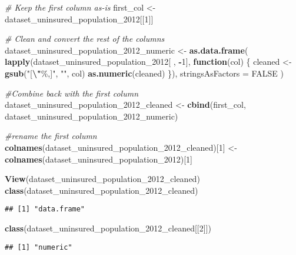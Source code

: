 \documentclass[
]{article}
\newenvironment{Shaded}{\begin{snugshade}}{\end{snugshade}}
\newcommand{\AttributeTok}[1]{\textcolor[rgb]{0.13,0.29,0.53}{#1}}
\newcommand{\CommentTok}[1]{\textcolor[rgb]{0.56,0.35,0.01}{\textit{#1}}}
\newcommand{\ConstantTok}[1]{\textcolor[rgb]{0.56,0.35,0.01}{#1}}
\newcommand{\ControlFlowTok}[1]{\textcolor[rgb]{0.13,0.29,0.53}{\textbf{#1}}}
\newcommand{\DecValTok}[1]{\textcolor[rgb]{0.00,0.00,0.81}{#1}}
\newcommand{\FunctionTok}[1]{\textcolor[rgb]{0.13,0.29,0.53}{\textbf{#1}}}
\newcommand{\NormalTok}[1]{#1}
\newcommand{\OtherTok}[1]{\textcolor[rgb]{0.56,0.35,0.01}{#1}}
\newcommand{\SpecialCharTok}[1]{\textcolor[rgb]{0.81,0.36,0.00}{\textbf{#1}}}
\newcommand{\StringTok}[1]{\textcolor[rgb]{0.31,0.60,0.02}{#1}}
\begin{document}
\begin{Shaded}
\begin{Highlighting}[]
\CommentTok{\# Keep the first column as{-}is}
\NormalTok{first\_col }\OtherTok{\textless{}{-}}\NormalTok{ dataset\_uninsured\_population\_2012[[}\DecValTok{1}\NormalTok{]]}

\CommentTok{\# Clean and convert the rest of the columns}
\NormalTok{dataset\_uninsured\_population\_2012\_numeric }\OtherTok{\textless{}{-}} \FunctionTok{as.data.frame}\NormalTok{(}
  \FunctionTok{lapply}\NormalTok{(dataset\_uninsured\_population\_2012[ , }\SpecialCharTok{{-}}\DecValTok{1}\NormalTok{], }\ControlFlowTok{function}\NormalTok{(col) \{}
\NormalTok{    cleaned }\OtherTok{\textless{}{-}} \FunctionTok{gsub}\NormalTok{(}\StringTok{"[}\SpecialCharTok{\textbackslash{}"}\StringTok{\%,]"}\NormalTok{, }\StringTok{""}\NormalTok{, col)}
    \FunctionTok{as.numeric}\NormalTok{(cleaned)}
\NormalTok{  \}),}
  \AttributeTok{stringsAsFactors =} \ConstantTok{FALSE}
\NormalTok{)}

\CommentTok{\#Combine back with the first column}
\NormalTok{dataset\_uninsured\_population\_2012\_cleaned }\OtherTok{\textless{}{-}} \FunctionTok{cbind}\NormalTok{(first\_col, dataset\_uninsured\_population\_2012\_numeric)}

\CommentTok{\#rename the first column}
\FunctionTok{colnames}\NormalTok{(dataset\_uninsured\_population\_2012\_cleaned)[}\DecValTok{1}\NormalTok{] }\OtherTok{\textless{}{-}} \FunctionTok{colnames}\NormalTok{(dataset\_uninsured\_population\_2012)[}\DecValTok{1}\NormalTok{]}

\FunctionTok{View}\NormalTok{(dataset\_uninsured\_population\_2012\_cleaned)}
\FunctionTok{class}\NormalTok{(dataset\_uninsured\_population\_2012\_cleaned)}
\end{Highlighting}
\end{Shaded}

\begin{verbatim}
## [1] "data.frame"
\end{verbatim}

\begin{Shaded}
\begin{Highlighting}[]
\FunctionTok{class}\NormalTok{(dataset\_uninsured\_population\_2012\_cleaned[[}\DecValTok{2}\NormalTok{]])}
\end{Highlighting}
\end{Shaded}

\begin{verbatim}
## [1] "numeric"
\end{verbatim}
\end{document}
